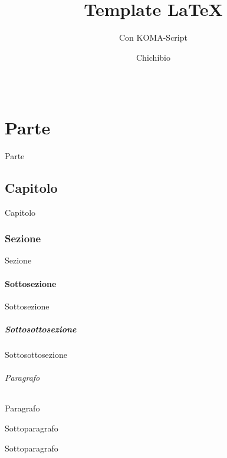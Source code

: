 \documentclass[fontsize=12pt,a4paper,DIV=16]{scrreprt}
\title{Template \LaTeX}
\subtitle{Con KOMA-Script}
\author{Chichibio}
\date{\ISOToday ~ \thistime}
\begin{document}
	
	\maketitle
	
	\cleardoublepage
	\tableofcontents
	
	\part{Parte}
	Parte

	\chapter{Capitolo}
	Capitolo
	\section{Sezione}
	Sezione
	\subsection{Sottosezione}
	Sottosezione
	\subsubsection{Sottosottosezione}
	Sottosottosezione

	\paragraph{Paragrafo}
	Paragrafo
	\subparagraph{Sottoparagrafo}
	Sottoparagrafo

	\lstlistoflistings
	\listoffigures
	\listoftables
	
	\nocite{IuriTex}
	
	
\end{document}
